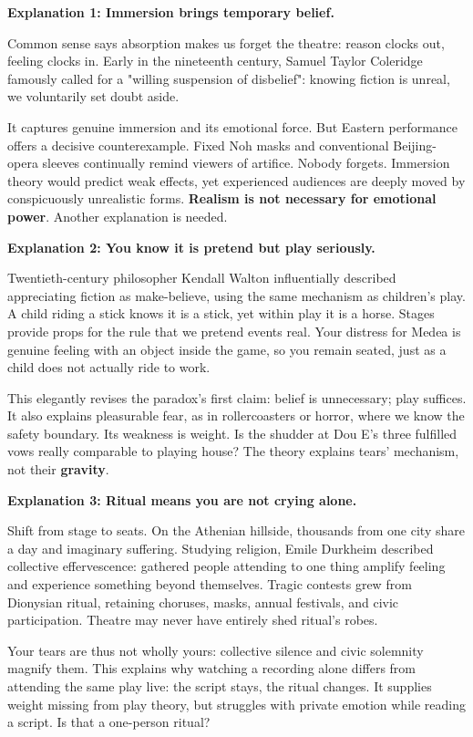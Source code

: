 \textbf{Explanation 1: Immersion brings temporary belief.}

Common sense says absorption makes us forget the theatre: reason clocks out, feeling clocks in. Early in the nineteenth century, Samuel Taylor Coleridge famously called for a "willing suspension of disbelief": knowing fiction is unreal, we voluntarily set doubt aside.

It captures genuine immersion and its emotional force. But Eastern performance offers a decisive counterexample. Fixed Noh masks and conventional Beijing-opera sleeves continually remind viewers of artifice. Nobody forgets. Immersion theory would predict weak effects, yet experienced audiences are deeply moved by conspicuously unrealistic forms. \textbf{Realism is not necessary for emotional power}. Another explanation is needed.

\textbf{Explanation 2: You know it is pretend but play seriously.}

Twentieth-century philosopher Kendall Walton influentially described appreciating fiction as make-believe, using the same mechanism as children's play. A child riding a stick knows it is a stick, yet within play it is a horse. Stages provide props for the rule that we pretend events real. Your distress for Medea is genuine feeling with an object inside the game, so you remain seated, just as a child does not actually ride to work.

This elegantly revises the paradox's first claim: belief is unnecessary; play suffices. It also explains pleasurable fear, as in rollercoasters or horror, where we know the safety boundary. Its weakness is weight. Is the shudder at Dou E's three fulfilled vows really comparable to playing house? The theory explains tears' mechanism, not their \textbf{gravity}.

\textbf{Explanation 3: Ritual means you are not crying alone.}

Shift from stage to seats. On the Athenian hillside, thousands from one city share a day and imaginary suffering. Studying religion, Emile Durkheim described collective effervescence: gathered people attending to one thing amplify feeling and experience something beyond themselves. Tragic contests grew from Dionysian ritual, retaining choruses, masks, annual festivals, and civic participation. Theatre may never have entirely shed ritual's robes.

Your tears are thus not wholly yours: collective silence and civic solemnity magnify them. This explains why watching a recording alone differs from attending the same play live: the script stays, the ritual changes. It supplies weight missing from play theory, but struggles with private emotion while reading a script. Is that a one-person ritual?

